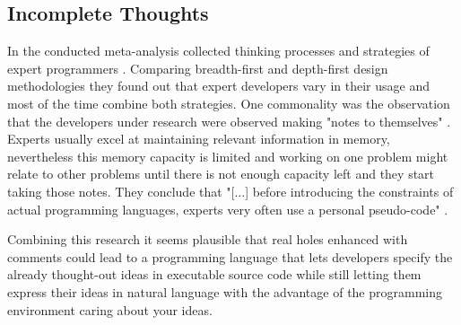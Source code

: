 \subsection{Incomplete Thoughts}
\label{sub:incomplete-thoughts}
In the \citeyear{visser_expert_1990} conducted meta-analysis  \citeauthor{visser_expert_1990} collected thinking processes and strategies of expert programmers \autocite{visser_expert_1990}.
Comparing breadth-first and depth-first design methodologies they found out that expert developers vary in their usage and most of the time combine both strategies.
One commonality was the observation that the developers under research were observed making "notes to themselves" \autocite[241]{visser_expert_1990}.
Experts usually excel at maintaining relevant information in memory, nevertheless this memory capacity is limited and working on one problem might relate to other problems until there is not enough capacity left and they start taking those notes.
They conclude that "[...] before introducing the constraints of actual programming languages, experts very often use a personal pseudo-code" \autocite[242]{visser_expert_1990}.

Combining this research it seems plausible that real holes enhanced with comments could lead to a programming language that lets developers specify the already thought-out ideas in executable source code while still letting them express their ideas in natural language with the advantage of the programming environment caring about your ideas.